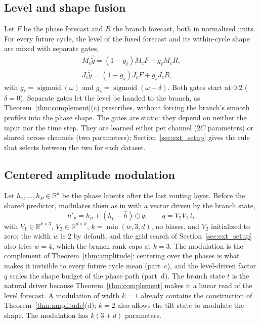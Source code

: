 {\subsection{Level and shape fusion}
\label{sec:ext_fusion}

Let $F$ be the phase forecast and $R$ the branch forecast, both in normalized units. For every future cycle, the level of the fused forecast and its within-cycle shape are mixed with separate gates,
\begin{equation}
\begin{gathered}
M_c\hat{\tilde y}=(1-g_\ell)M_cF+g_\ell M_cR,\\
J_c\hat{\tilde y}=(1-g_s)J_cF+g_sJ_cR,
\end{gathered}
\label{eq:fusion}
\end{equation}
with $g_\ell=\operatorname{sigmoid}(\omega)$ and $g_s=\operatorname{sigmoid}(\omega+\delta)$. Both gates start at $0.2$ ($\delta=0$). Separate gates let the level be handed to the branch, as Theorem~\ref{thm:complement}(c) prescribes, without forcing the branch's smooth profiles into the phase shape. The gates are static: they depend on neither the input nor the time step. They are learned either per channel ($2C$ parameters) or shared across channels (two parameters); Section~\ref{sec:ext_setup} gives the rule that selects between the two for each dataset.

\subsection{Centered amplitude modulation}
\label{sec:ext_modulation}

Let $h_1,\dots,h_P\in\mathbb R^d$ be the phase latents after the last routing layer. Before the shared predictor, \sysLA modulates them as in  with a vector driven by the branch state,
\begin{equation}
h'_p=h_p+(h_p-\bar h)\odot q,\qquad q=V_2V_1\,t,
\label{eq:la_modulation}
\end{equation}
with $V_1\in\mathbb R^{k\times3}$, $V_2\in\mathbb R^{d\times k}$, $k=\min(w,3,d)$, no biases, and $V_2$ initialized to zero; the width $w$ is $2$ by default, and the grid search of Section~\ref{sec:ext_setup} also tries $w=4$, which the branch rank caps at $k=3$. The modulation is the complement of Theorem~\ref{thm:amplitude}: centering over the phases is what makes it invisible to every future cycle mean (part~c), and the level-driven factor $q$ scales the shape budget of the phase path (part~d). The branch state $t$ is the natural driver because Theorem~\ref{thm:complement} makes it a linear read of the level forecast. A modulation of width $k=1$ already contains the construction of Theorem~\ref{thm:amplitude}(d); $k=2$ also allows the tilt state to modulate the shape. The modulation has $k(3+d)$ parameters.

}
